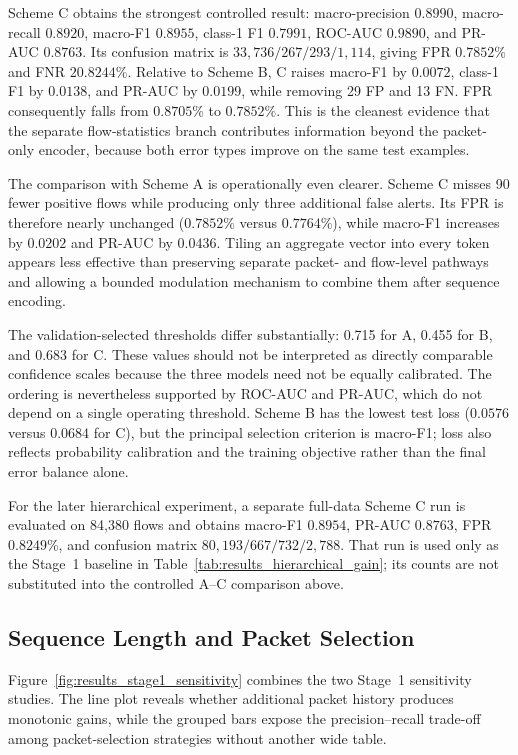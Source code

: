 Scheme C obtains the strongest controlled result: macro-precision $0.8990$,
macro-recall $0.8920$, macro-F1 $0.8955$, class-1 F1 $0.7991$, ROC-AUC
$0.9890$, and PR-AUC $0.8763$. Its confusion matrix is
$33{,}736/267/293/1{,}114$, giving FPR $0.7852\%$ and FNR $20.8244\%$.
Relative to Scheme B, C raises macro-F1 by $0.0072$, class-1 F1 by $0.0138$,
and PR-AUC by $0.0199$, while removing 29 FP and 13 FN. FPR consequently falls
from $0.8705\%$ to $0.7852\%$. This is the cleanest evidence that the separate
flow-statistics branch contributes information beyond the packet-only encoder,
because both error types improve on the same test examples.

The comparison with Scheme A is operationally even clearer. Scheme C misses 90
fewer positive flows while producing only three additional false alerts. Its
FPR is therefore nearly unchanged ($0.7852\%$ versus $0.7764\%$), while
macro-F1 increases by $0.0202$ and PR-AUC by $0.0436$. Tiling an aggregate
vector into every token appears less effective than preserving separate
packet- and flow-level pathways and allowing a bounded modulation mechanism to
combine them after sequence encoding.

The validation-selected thresholds differ substantially: 0.715 for A, 0.455
for B, and 0.683 for C. These values should not be interpreted as directly
comparable confidence scales because the three models need not be equally
calibrated. The ordering is nevertheless supported by ROC-AUC and PR-AUC,
which do not depend on a single operating threshold. Scheme B has the lowest
test loss ($0.0576$ versus $0.0684$ for C), but the principal selection
criterion is macro-F1; loss also reflects probability calibration and the
training objective rather than the final error balance alone.

For the later hierarchical experiment, a separate full-data Scheme C run is
evaluated on 84,380 flows and obtains macro-F1 $0.8954$, PR-AUC $0.8763$, FPR
$0.8249\%$, and confusion matrix $80{,}193/667/732/2{,}788$. That run is used
only as the Stage~1 baseline in Table~\ref{tab:results_hierarchical_gain}; its
counts are not substituted into the controlled A--C comparison above.

\subsection{Sequence Length and Packet Selection}
\label{subsubsec:results_sequence_length}

Figure~\ref{fig:results_stage1_sensitivity} combines the two Stage~1
sensitivity studies. The line plot reveals whether additional packet history
produces monotonic gains, while the grouped bars expose the precision--recall
trade-off among packet-selection strategies without another wide table.

